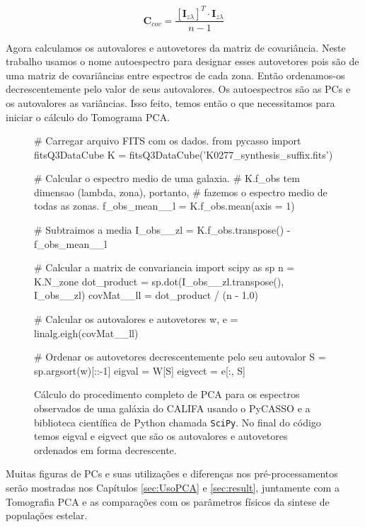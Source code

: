 \begin{equation}
	\label{eq:PCA:covMatrix}
	\mathbf{C}{}_{cov} = \frac{[\mathbf{I}{}_{z \lambda}]^T \cdot \mathbf{I}{}_{z
	\lambda}}{n - 1}
\end{equation}

Agora calculamos os autovalores e autovetores da matriz de covariância. Neste
trabalho usamos o nome autoespectro para designar esses autovetores pois são de
uma matriz de covariâncias entre espectros de cada zona. Então ordenamos-os
decrescentemente pelo valor de seus autovalores. Os autoespectros são as PCs e
os autovalores as variâncias. Isso feito, temos então o que necessitamos para
iniciar o cálculo do Tomograma PCA.

\begin{figure}
\begin{python}
# Carregar arquivo FITS com os dados.
from pycasso import fitsQ3DataCube
K = fitsQ3DataCube('K0277_synthesis_suffix.fits')

# Calcular o espectro medio de uma galaxia. 
# K.f_obs tem dimensao (lambda, zona), portanto, 
# fazemos o espectro medio de todas as zonas.
f_obs_mean__l = K.f_obs.mean(axis = 1)

# Subtraimos a media
I_obs__zl = K.f_obs.transpose() - f_obs_mean__l

# Calcular a matrix de convariancia
import scipy as sp
n = K.N_zone
dot_product = sp.dot(I_obs__zl.transpose(), I_obs__zl)
covMat__ll = dot_product / (n - 1.0)   

# Calcular os autovalores e autovetores
w, e = linalg.eigh(covMat__ll)

# Ordenar os autovetores decrescentemente pelo seu autovalor
S = sp.argsort(w)[::-1]
eigval = W[S]
eigvect = e[:, S]
 
\end{python}
	\caption[Exemplo de cálculo de PCA usando o PyCASSO e SciPy] {Cálculo do
	procedimento completo de PCA para os espectros observados de uma galáxia do
	CALIFA usando o PyCASSO e a biblioteca científica de Python chamada
	\texttt{SciPy}. No final do código temos eigval e eigvect que são os
	autovalores e autovetores ordenados em forma decrescente.}
	\label{fig:PCA:covMatrix}
\end{figure}

Muitas figuras de PCs e suas utilizações e diferenças nos pré-processamentos
serão mostradas nos Capítulos \ref{sec:UsoPCA} e \ref{sec:result}, juntamente
com a Tomografia PCA e as comparações com os parâmetros físicos da sintese de
populações estelar.


